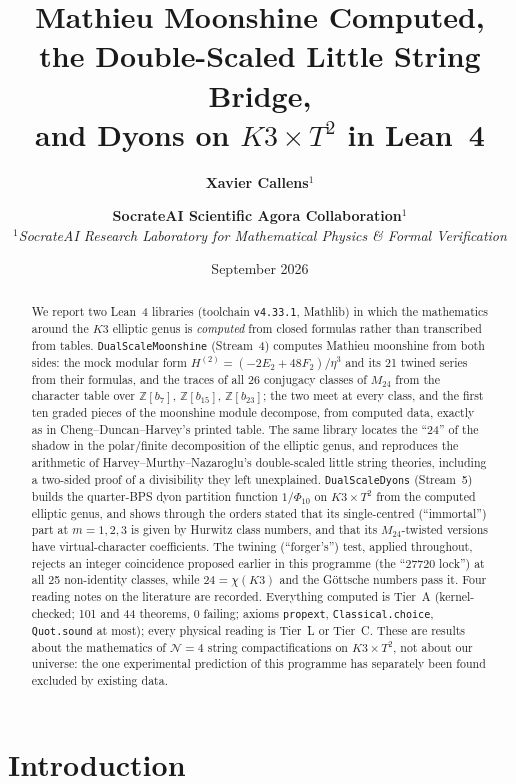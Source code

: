 \documentclass[11pt,a4paper]{article}
\title{\Huge \textbf{Mathieu Moonshine Computed,}\\[0.3em]
\LARGE \textbf{the Double-Scaled Little String Bridge,}\\[0.2em]
and Dyons on $K3\times T^2$ in Lean~4}
\author{\textbf{Xavier Callens}$^{1}$ \and \textbf{SocrateAI Scientific Agora Collaboration}$^{1}$ \\[0.5em]
$^{1}$\textit{SocrateAI Research Laboratory for Mathematical Physics \& Formal Verification}}
\date{September 2026}
\theoremstyle{remark}
\newcommand{\Mtf}{M_{24}}
\begin{document}
\maketitle

\begin{abstract}
We report two Lean~4 libraries (toolchain \texttt{v4.33.1}, Mathlib) in which the mathematics
around the $K3$ elliptic genus is \emph{computed} from closed formulas rather than transcribed from
tables. \texttt{DualScaleMoonshine} (Stream~4) computes Mathieu moonshine from both sides: the
mock modular form $H^{(2)}=(-2E_2+48F_2)/\eta^3$ and its 21 twined series from their formulas, and
the traces of all 26 conjugacy classes of $\Mtf$ from the character table over $\mathbb{Z}[b_7]$,
$\mathbb{Z}[b_{15}]$, $\mathbb{Z}[b_{23}]$; the two meet at every class, and the first ten graded
pieces of the moonshine module decompose, from computed data, exactly as in Cheng--Duncan--Harvey's
printed table. The same library locates the ``24'' of the shadow in the polar/finite decomposition of
the elliptic genus, and reproduces the arithmetic of Harvey--Murthy--Nazaroglu's double-scaled little
string theories, including a two-sided proof of a divisibility they left unexplained.
\texttt{DualScaleDyons} (Stream~5) builds the quarter-BPS dyon partition function $1/\Phi_{10}$ on
$K3\times T^2$ from the computed elliptic genus, and shows through the orders stated that its
single-centred (``immortal'') part at $m=1,2,3$ is given by Hurwitz class numbers, and that its
$\Mtf$-twisted versions have virtual-character coefficients. The twining (``forger's'') test, applied
throughout, rejects an integer coincidence proposed earlier in this programme (the ``27720 lock'')
at all 25 non-identity classes, while $24=\chi(K3)$ and the Göttsche numbers pass it. Four
reading notes on the literature are recorded. Everything computed is Tier~A (kernel-checked; 101
and 44 theorems, 0 failing; axioms \texttt{propext}, \texttt{Classical.choice}, \texttt{Quot.sound}
at most); every physical reading is Tier~L or Tier~C. These are results about the mathematics of
$\mathcal{N}=4$ string compactifications on $K3\times T^2$, not about our universe: the one
experimental prediction of this programme has separately been found excluded by existing data.
\end{abstract}

\newpage
\tableofcontents
\newpage

\section{Introduction}
\label{sec:intro}
\end{document}
